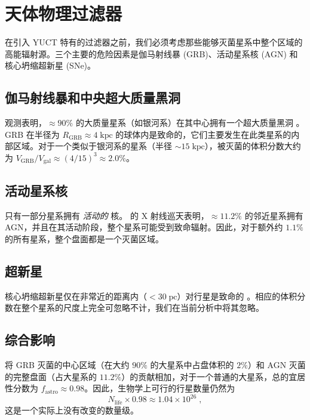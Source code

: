 \documentclass[11pt,a4paper]{article}
\begin{document}
	\section{天体物理过滤器}
	\label{sec:astro_filters}
	在引入 YUCT 特有的过滤器之前，我们必须考虑那些能够灭菌星系中整个区域的高能辐射源。三个主要的危险因素是伽马射线暴 (GRB)、活动星系核 (AGN) 和核心坍缩超新星 (SNe)。
	
	\subsection{伽马射线暴和中央超大质量黑洞}
	\label{sec:grb}
	观测表明，\(\approx 90\%\) 的大质量星系（如银河系）在其中心拥有一个超大质量黑洞 \citep{Chandra2025}。GRB 在半径为 \(R_{\mathrm{GRB}} \approx 4\;\mathrm{kpc}\) 的球体内是致命的，它们主要发生在此类星系的内部区域。对于一个类似于银河系的星系（半径 \(\sim 15\;\mathrm{kpc}\)），被灭菌的体积分数大约为 \(V_{\mathrm{GRB}}/V_{\mathrm{gal}} \approx (4/15)^{3} \approx 2.0\%\)。
	
	\subsection{活动星系核}
	\label{sec:agn}
	只有一部分星系拥有 \emph{活动的} 核。\citet{Foord2017} 的 X 射线巡天表明，\(\approx 11.2\%\) 的邻近星系拥有 AGN，并且在其活动阶段，整个星系可能受到致命辐射。因此，对于额外约 \(1.1\%\) 的所有星系，整个盘面都是一个灭菌区域。
	
	\subsection{超新星}
	\label{sec:sne}
	核心坍缩超新星仅在非常近的距离内（\(< 30\;\mathrm{pc}\)）对行星是致命的 \citep{ThomasYelland2023}。相应的体积分数在整个星系的尺度上完全可忽略不计，我们在当前分析中将其忽略。
	
	\subsection{综合影响}
	\label{sec:total_astro}
	将 GRB 灭菌的中心区域（在大约 \(90\%\) 的大星系中占盘体积的 \(2\%\)）和 AGN 灭菌的完整盘面（占大星系的 \(11.2\%\)）的贡献相加，对于一个普通的大星系，总的宜居性分数为 \(f_{\mathrm{astro}} \approx 0.98\)。因此，生物学上可行的行星数量仍然为
	\begin{equation}
		N_{\mathrm{life}} \times 0.98 \approx 1.04\times 10^{26}\; ,
	\end{equation}
	这是一个实际上没有改变的数量级。
	
\end{document}

